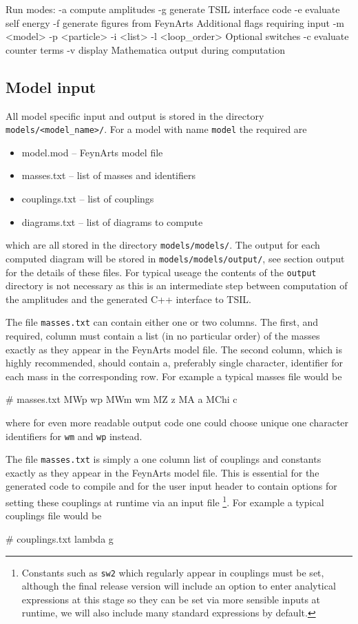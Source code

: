 \begin{lstterm}
Run modes:
-a 		compute amplitudes
-g		generate TSIL interface code
-e		evaluate self energy
-f		generate figures from FeynArts
Additional flags requiring input
-m <model> 
-p <particle>
-i  <list>
-l <loop_order>
Optional switches
-c		evaluate counter terms
-v		display Mathematica output during computation
\end{lstterm}


\subsection{Model input}

All model specific input and output is stored in the directory \lstinline{models/<model_name>/}.  For a model with name \lstinline{model} the required are
\begin{itemize}
\item model.mod  -- FeynArts model file
\item masses.txt -- list of masses and identifiers
\item couplings.txt -- list of couplings
\item diagrams.txt -- list of diagrams to compute
\end{itemize}
which are all stored in the directory \lstinline{models/models/}.  The output for each computed diagram will be stored in \lstinline{models/models/output/}, see section output for the details of these files.  For typical useage the contents of the \lstinline{output} directory is not necessary as this is an intermediate step between computation of the amplitudes and the generated C++ interface to TSIL.

The file \lstinline{masses.txt} can contain either one or two columns.  The first, and required, column must contain a list (in no particular order) of the masses exactly as they appear in the FeynArts model file.  The second column, which is highly recommended, should contain a, preferably single character, identifier for each mass in the corresponding row.  For example a typical masses file would be
\begin{lstterm}
# masses.txt
MWp          wp
MWm          wm
MZ           z
MA           a
MChi	       c
\end{lstterm}
where for even more readable output code one could choose unique one character identifiers for \lstinline{wm} and \lstinline{wp} instead.

The file \lstinline{masses.txt} is simply a one column list of couplings and constants exactly as they appear in the FeynArts model file.  This is essential for the generated code to compile and for the user input header to contain options for setting these couplings at runtime via an input file \footnote{Constants such as \lstinline{sw2} which regularly appear in couplings must be set, although the final release version will include an option to enter analytical expressions at this stage so they can be set via more sensible inputs at runtime, we will also include many standard expressions by default.}.  For example a typical couplings file would be
\begin{lstterm}
# couplings.txt
lambda
g
\end{lstterm}

